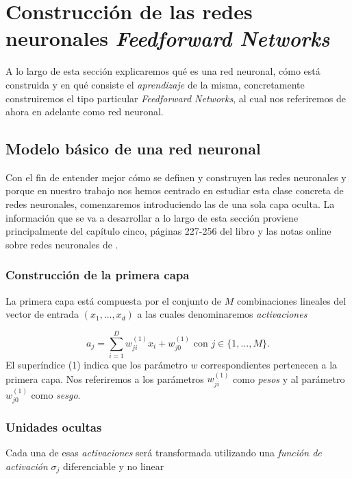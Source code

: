 %
\section{Construcción de las redes neuronales \textit{Feedforward Networks}}

A lo largo de esta sección  explicaremos qué es una red neuronal, cómo está construida y en qué consiste el \textit{aprendizaje} de la misma, concretamente
construiremos el tipo particular \textit{Feedforward Networks}, al cual nos referiremos de ahora
en adelante como red neuronal.

\subsection{Modelo básico de una red neuronal} \label{rrnn:modelo_simple_rrnn}  

Con el fin de entender mejor cómo se definen y construyen las redes neuronales y porque en nuestro trabajo nos hemos centrado en estudiar
esta clase concreta de redes neuronales,
comenzaremos 
introduciendo las de una sola capa oculta. 
La información que se va a desarrollar a lo largo de esta 
sección proviene principalmente del capítulo cinco, páginas 227-256 del libro \cite{BishopPaterRecognition} y las notas online sobre redes neuronales de \cite{MostafaLearningFromData}.


\subsubsection*{Construcción de la primera capa}
La primera capa está compuesta por el conjunto de $M$ combinaciones
lineales del vector de entrada $(x_1, \ldots, x_d)$
a las cuales denominaremos \textit{activaciones}

\begin{equation}
    a_j = \sum_{i=1}^D w_{ji}^{(1)} x_i + w_{j0}^{(1)}
    \text{ con } j \in \{1, \ldots, M \}.
\end{equation}
El superíndice (1) indica que los parámetro $w$ correspondientes pertenecen a la primera capa. 
Nos referiremos a los  parámetros $w_{ji}^{(1)}$ como 
\textit{pesos} y al parámetro $w_{j0}^{(1)}$ como 
\textit{sesgo}.  

\subsubsection*{Unidades ocultas}
Cada una de esas \textit{activaciones} será transformada
utilizando una \textit{función de activación} $\sigma_j$ 
diferenciable y no linear

